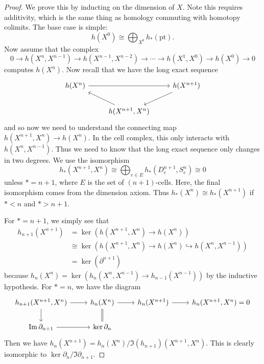 \documentclass[leqno, openany]{memoir}
\theoremstyle{definition}
\theoremstyle{remark}
\theoremstyle{plain}
\theoremstyle{definition}
\theoremstyle{remark}
\newcommand{\mr}[1]{\mathrm{#1}}
\begin{document}
\begin{proof}
    We prove this by inducting on the dimension of $X$. Note this requires additivity, which is the same thing as homology commuting with homotopy colimits. The base case is simple:
    \[ h(X^0) \cong \bigoplus_{X^0} h_*(\mr{pt}). \]
    Now assume that the complex
    \[ 0 \to h(X^n, X^{n-1}) \to h(X^{n-1}, X^{n-2}) \to \cdots \to h(X^1, X^0) \to h(X^0) \to 0 \]
    computes $h(X^n)$. Now recall that we have the long exact sequence
    \begin{equation*}
    \begin{tikzcd}
        h(X^n) \arrow{rr} & & h(X^{n+1}) \arrow{dl} \\
                          & h(X^{n+1}, X^n) \arrow{ul}
    \end{tikzcd}
    \end{equation*}
    and so now we need to understand the connecting map $h(X^{n+1}, X^n) \to h(X^n)$. In the cell complex, this only interacts with $h(X^n, X^{n-1})$. Thus we need to know that the long exact sequence only changes in two degrees. We use the isomorphism
    \[ h_*(X^{n+1}, X^n) \cong \bigoplus_{e \in E} h_*(D_e^{n+1}, S_e^n) \cong 0 \]
    unless $* = n+1$, where $E$ is the set of $(n+1)$-cells. Here, the final isomorphism comes from the dimension axiom. Thus $h_*(X^n) \cong h_*(X^{n+1})$ if $* < n$ and $* > n+1$.

    For $* = n+1$, we simply see that
    \begin{align*}
        h_{n+1}(X^{n+1}) &= \ker(h(X^{n+1}, X^n) \to h(X^n)) \\
                         &\cong \ker(h(X^{n+1}, X^n) \to h(X^n) \hookrightarrow h(X^n, X^{n-1})) \\
                         &= \ker(\partial^{n+1})
    \end{align*}
    because $h_n(X^n) = \ker(h_n(X^n, X^{n-1}) \to h_{n-1}(X^{n-1}))$ by the inductive hypothesis. For $* = n$, we have the diagram
    \begin{equation*}
    \begin{tikzcd}
        h_{n+1}(X^{n+1}, X^n) \arrow{d} \arrow{r} & h_n(X^n) \arrow{r} \arrow[equal]{d} & h_n(X^{n+1}) \arrow{r} & h_n(X^{n+1}, X^n) = 0 \\
        \Im \partial_{n+1} \arrow{r} & \ker \partial_n
    \end{tikzcd}
    \end{equation*}
    Then we have $h_n(X^{n+1}) = h_n(X^n) / \Im(h_{n+1})(X^{n+1}, X^n)$. This is clearly isomorphic to $\ker \partial_n / \Im \partial_{n+1}$.
\end{proof}
\end{document}
